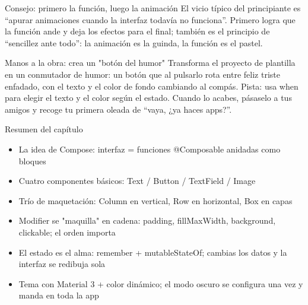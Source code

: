 \begin{tcbinfo}{Consejo: primero la función, luego la animación}
El vicio típico del principiante es “apurar animaciones cuando la interfaz todavía no funciona”. Primero logra que la función ande y deja los efectos para el final; también es el principio de “sencillez ante todo”: la animación es la guinda, la función es el pastel.

\end{tcbinfo}

\begin{tcbpractice}{Manos a la obra: crea un "botón del humor"}
Transforma el proyecto de plantilla en un conmutador de humor: un botón que al pulsarlo rota entre feliz triste enfadado, con el texto y el color de fondo cambiando al compás. Pista: usa when para elegir el texto y el color según el estado. Cuando lo acabes, pásaselo a tus amigos y recoge tu primera oleada de “vaya, ¿ya haces apps?”.

\end{tcbpractice}

\begin{tcbsummary}{Resumen del capítulo}
\begin{itemize}
  \item La idea de Compose: interfaz = funciones @Composable anidadas como bloques
  \item Cuatro componentes básicos: Text / Button / TextField / Image
  \item Trío de maquetación: Column en vertical, Row en horizontal, Box en capas
  \item Modifier se "maquilla" en cadena: padding, fillMaxWidth, background, clickable; el orden importa
  \item El estado es el alma: remember + mutableStateOf; cambias los datos y la interfaz se redibuja sola
  \item Tema con Material 3 + color dinámico; el modo oscuro se configura una vez y manda en toda la app
\end{itemize}

\end{tcbsummary}
